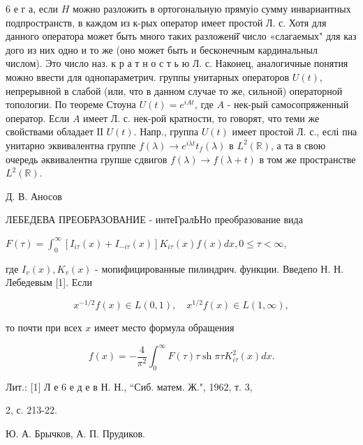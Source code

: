 \documentclass[10pt]{article}
\begin{document}
6 е г а, если $H$ можно разложить в ортогональную прямуіо сумму инвариантных подпространств, в каждом из к-рых оператор имеет простой Л. с. Хотя для данного оператора может быть много таких разложенй̆ число «слагаемых" для каз дого из них одно и то же (оно может быть и бесконечным кардинальныл числом). Это число наз. к р а т н о с т ь ю Л. с. Наконец, аналогичные понятия можно ввести для однопараметрич. группы унитарных операторов $U(t)$, непрерывной в слабой (или, что в данном случае то же, сильной) операторной топологии. По теореме Стоуна $U(t)=e^{i A t}$, где $A$ - нек-рый самосопряженный оператор. Если $A$ имеет Л. с. нек-рой кратности, то говорят, что теми же свойствами обладает ІІ $U(t)$. Напр., группа $U(t)$ имеет простой Л. с., еслі пна унитарно эквивалентна группе $f(\lambda) \rightarrow e^{i \lambda t} t_{f}(\lambda)$ в $L^{2}(\mathbb{R})$, а та в свою очередь әквивалентна групше сдвигов $f(\lambda) \rightarrow f(\lambda+t)$ в том же пространстве $L^{2}(\mathbb{R})$.



Д. В. Аносов



ЛЕБЕДЕВА ПРЕОБРАЗОВАНИЕ - интеГралЬНо преобразование вида



$F(\tau)=\int_{0}^{\infty}\left[I_{i \tau}(x)+I_{-i \tau}(x)\right] K_{i \tau}(x) f(x) d x, 0 \leqslant \tau<\infty$,



где $I_{v}(x), K_{v}(x)$ - мопифицированные пилиндрич. функции. Введепо Н. Н. Лебедевым [1]. Если



\[

x^{-1 / 2} f(x) \in L(0,1), \quad x^{1 / 2} f(x) \in L(1, \infty),

\]



то почти при всех $x$ имеет место формула обращения



\[

f(x)=-\frac{4}{\pi^{2}} \int_{0}^{\infty} F(\tau) \tau \operatorname{sh} \pi \tau K_{i \tau}^{2}(x) d x .

\]



Лит.: [1] Л е 6 е д е в Н. Н., “Сиб. матем. Ж.", 1962, т. 3,

2, с. 213-22.

Ю. А. Брычков, А. П. Прудиков.
\end{document}
